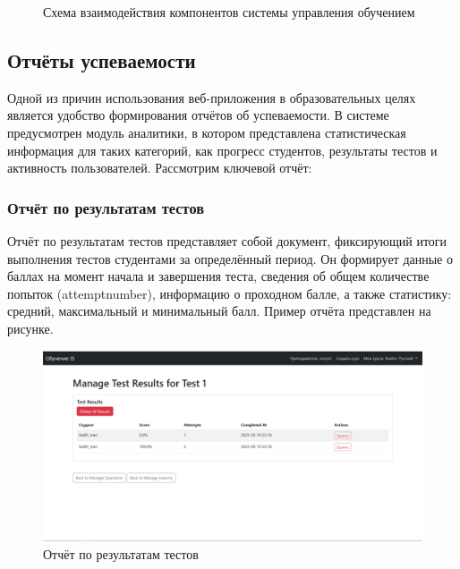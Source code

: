 \begin{figure}[ht]
	\centering
	\caption{Схема взаимодействия компонентов системы управления обучением}
	\label{system:image}
\end{figure}


\subsection{Отчёты успеваемости}
Одной из причин использования веб-приложения в образовательных целях является удобство формирования отчётов об успеваемости. В системе предусмотрен модуль аналитики, в котором представлена статистическая информация для таких категорий, как прогресс студентов, результаты тестов и активность пользователей. Рассмотрим ключевой отчёт:

\subsubsection{Отчёт по результатам тестов}
Отчёт по результатам тестов представляет собой документ, фиксирующий итоги выполнения тестов студентами за определённый период. Он формирует данные о баллах на момент начала и завершения теста, сведения об общем количестве попыток (attemptnumber), информацию о проходном балле, а также статистику: средний, максимальный и минимальный балл. Пример отчёта представлен на рисунке. 

\begin{figure}[ht]
	\centering
	\includegraphics[width=0.7\linewidth]{images/результаты} 
	\caption{Отчёт по результатам тестов}
	\label{zotchet:image}
\end{figure}

